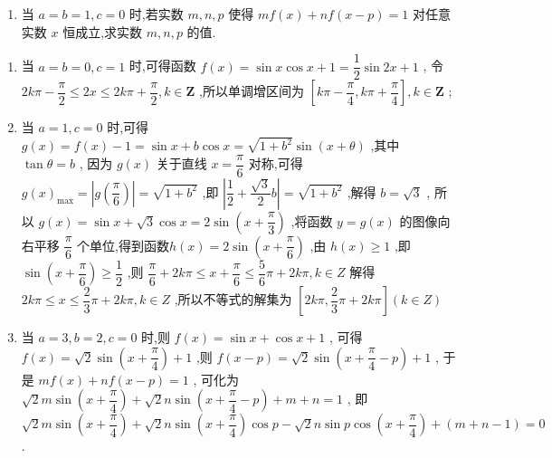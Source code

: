 \begin{enumerate}
\begin{enumerate}
    \item 当 $ a = b = 1,c = 0 $ 时,若实数 $ m,n,p $ 使得 $ {mf}\left( x\right)  + {nf}\left( {x - p}\right)  = 1 $ 对任意实数 $ x $ 恒成立,求实数 $ m,n,p $ 的值.
\end{enumerate}
\begin{jieda}
    \begin{enumerate}
        \item 当 $ a = b = 0,c = 1 $ 时,可得函数 $ f\left( x\right)  = \sin x\cos x + 1 = \dfrac{1}{2}\sin {2x} + 1 $ ,
        令 $ {2k\pi } - \dfrac{\pi }{2} \leq  {2x} \leq  {2k\pi } + \dfrac{\pi }{2},k \in  \mathbf{Z} $ ,所以单调增区间为 $ \left\lbrack  {{k\pi } - \dfrac{\pi }{4},{k\pi } + \dfrac{\pi }{4}}\right\rbrack  ,k \in  \mathbf{Z} $ ;
        \item 当 $ a = 1,c = 0 $ 时,可得 $ g\left( x\right)  = f\left( x\right)  - 1 = \sin x + b\cos x = \sqrt{1 + {b}^{2}}\sin \left( {x + \theta }\right) $ ,其中 $ \tan \theta  = b $ ,
        因为 $ g\left( x\right) $ 关于直线 $ x = \dfrac{\pi }{6} $ 对称,可得 $ g{\left( x\right) }_{\max } = \left| {g\left( \dfrac{\pi }{6}\right) }\right|  = \sqrt{1 + {b}^{2}} $ ,即 $ \left| {\dfrac{1}{2} + \dfrac{\sqrt{3}}{2}b}\right|  = \sqrt{1 + {b}^{2}} $ ,解得 $ b = \sqrt{3} $ ,
        所以 $ g\left( x\right)  = \sin x + \sqrt{3}\cos x = 2\sin \left( {x + \dfrac{\pi }{3}}\right) $ ,将函数 $ y = g\left( x\right) $ 的图像向右平移 $ \dfrac{\pi }{6} $ 个单位,得到函数$ h\left( x\right)  = 2\sin \left( {x + \dfrac{\pi }{6}}\right) $ ,由 $ h\left( x\right)  \geq  1 $ ,即 $ \sin \left( {x + \dfrac{\pi }{6}}\right)  \geq  \dfrac{1}{2} $ ,则 $ \dfrac{\pi }{6} + {2k\pi } \leq  x + \dfrac{\pi }{6} \leq  \dfrac{5}{6}\pi  + {2k\pi },k \in  Z $
        解得 $ {2k\pi } \leq  x \leq  \dfrac{2}{3}\pi  + {2k\pi },k \in  Z $ ,所以不等式的解集为 $ \left\lbrack  {{2k\pi },\dfrac{2}{3}\pi  + {2k\pi }}\right\rbrack  \left( {k \in  Z}\right) $ 
        \item 当 $ a = 3,b = 2,c = 0 $ 时,则 $ f\left( x\right)  = \sin x + \cos x + 1 $ ,
        可得 $ f\left( x\right)  = \sqrt{2}\sin \left( {x + \dfrac{\pi }{4}}\right)  + 1 $ ,则 $ f\left( {x - p}\right)  = \sqrt{2}\sin \left( {x + \dfrac{\pi }{4} - p}\right)  + 1 $ ,
        于是 $ {mf}\left( x\right)  + {nf}\left( {x - p}\right)  = 1 $ ,
        可化为 $ \sqrt{2}m\sin \left( {x + \dfrac{\pi }{4}}\right)  + \sqrt{2}n\sin \left( {x + \dfrac{\pi }{4} - p}\right)  + m + n = 1 $ ,
        即 $ \sqrt{2}m\sin \left( {x + \dfrac{\pi }{4}}\right)  + \sqrt{2}n\sin \left( {x + \dfrac{\pi }{4}}\right) \cos p - \sqrt{2}n\sin p\cos \left( {x + \dfrac{\pi }{4}}\right)  + \left( {m + n - 1}\right)  = 0 $ .

\end{enumerate}
\end{jieda}
\end{enumerate}
